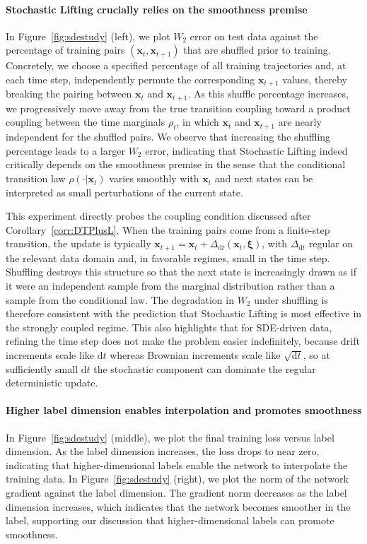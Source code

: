 \documentclass{article}
\theoremstyle{plain}
\theoremstyle{definition}
\theoremstyle{remark}
\newcommand{\bfxi}{{\bm \xi}}
\newcommand{\x}{\bm{x}}
\newcommand{\rd}{\mathrm{d}}
\begin{document}
\vspace*{-0.25cm}\paragraph{Stochastic Lifting crucially relies on the smoothness premise} In Figure~\ref{fig:sdestudy} (left), we plot $W_2$ error on test data against the percentage of training pairs $(\x_t, \x_{t + 1})$ that are shuffled prior to training. Concretely, we choose a specified percentage of all training trajectories and, at each time step, independently permute the corresponding $\x_{t + 1}$ values, thereby breaking the pairing between $\x_t$ and $\x_{t + 1}$. As this shuffle percentage increases, we progressively move away from the true transition coupling toward a product coupling between the time marginals $\rho_t$, in which $\x_t$ and $\x_{t + 1}$ are nearly independent for the shuffled pairs. We observe that increasing the shuffling percentage leads to a larger $W_2$ error, indicating that Stochastic Lifting indeed critically depends on the smoothness premise in the sense that the conditional transition law $\rho(\cdot | \x_t)$ varies smoothly with $\x_t$ and next states can be interpreted as small perturbations of the current state. 

This experiment directly probes the coupling condition discussed after Corollary~\ref{corr:DTPlusL}. When the training pairs come from a  finite-step transition,  the update is typically  $\x_{t+1}=\x_t+\Delta_{\rd t}(\x_t,\bfxi)$, with $\Delta_{\rd t}$ regular on the relevant data domain and, in favorable regimes, small in the time step. Shuffling destroys this structure so that the next state is increasingly drawn as if it were an independent sample from the marginal distribution rather than a sample from the   conditional law. The degradation in $W_2$ under shuffling is therefore consistent with the prediction that Stochastic Lifting is most effective in the strongly coupled regime. This also highlights that for SDE-driven data, refining the time step does not make the problem easier indefinitely, because drift increments scale like $\rd t$ whereas Brownian increments scale like $\sqrt{\rd t}$, so at sufficiently small $\rd t$ the stochastic component can dominate the regular deterministic update.

\vspace*{-0.25cm}\paragraph{Higher label dimension enables interpolation and promotes smoothness}
In Figure~\ref{fig:sdestudy} (middle), we plot the final training loss versus label dimension. As the label dimension increases, the loss drops to near zero, indicating that higher-dimensional labels enable the network to interpolate the training data.
In Figure~\ref{fig:sdestudy} (right), we plot the norm of the network gradient against the label dimension. The gradient norm decreases as the label dimension increases, which indicates that the network becomes smoother in the label, supporting our discussion that higher-dimensional labels can promote smoothness.
\end{document}
